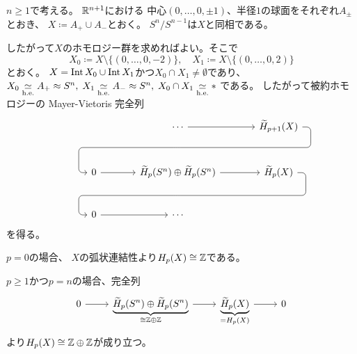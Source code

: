 \documentclass[report]{jlreq}
\begin{document}
\begin{answer}
    $n \ge 1$で考える。
    $\mathbb{R}^{n + 1}$における
    中心$(0, \dots, 0, \pm 1)$、半径$1$の球面をそれぞれ$A_{\pm}$とおき、
    $X \coloneqq A_+ \cup A_-$とおく。
    $S^n / S^{n - 1}$は$X$と同相である。
    \begin{innerproof}
        \TODO{}
    \end{innerproof}
    したがって$X$のホモロジー群を求めればよい。そこで
    \begin{equation}
        X_0 \coloneqq X \setminus \{ (0, \dots, 0, -2) \},
        \quad
        X_1 \coloneqq X \setminus \{ (0, \dots, 0, 2) \}
    \end{equation}
    とおく。
    $X = \operatorname{Int} X_0 \cup \operatorname{Int} X_1$かつ$X_0 \cap X_1 \neq \emptyset$であり、
    $X_0 \simeqhe A_+ \approx S^n, \;
        X_1 \simeqhe A_- \approx S^n, \;
        X_0 \cap X_1 \simeqhe *$
    である。
    したがって被約ホモロジーの Mayer-Vietoris 完全列
    \begin{equation}
        \begin{tikzcd}[column sep=large, row sep=large]
            && \cdots
                \ar{r} \ar[phantom]{d}[name=X1, anchor=center]{}
                & \widetilde{H}_{p+1}(X)
                    \ar[rounded corners,
                        to path={
                            -- ([xshift=2ex]\tikztostart.east)
                            |- (X1.center) \tikztonodes
                            -| ([xshift=-2ex]\tikztotarget.west)
                            -- (\tikztotarget)
                        }]{dll} \\
            & 0
                \ar{r}
                & \widetilde{H}_p(S^n) \oplus \widetilde{H}_p(S^n)
                    \ar{r}
                    \ar[phantom]{d}[name=X2, anchor=center]{}
                & \widetilde{H}_p(X)
                    \ar[rounded corners,
                        to path={
                            -- ([xshift=2ex]\tikztostart.east)
                            |- (X2.center) \tikztonodes
                            -| ([xshift=-2ex]\tikztotarget.west)
                            -- (\tikztotarget)
                        }]{dll} \\
            & 0
                \ar{r}
                & \cdots
        \end{tikzcd}
    \end{equation}
    を得る。

    $p = 0$の場合、
    $X$の弧状連結性より$H_p(X) \cong \mathbb{Z}$である。

    $p \ge 1$かつ$p = n$の場合、完全列
    \begin{equation}
        \begin{tikzcd}
            0
                \ar{r}
                & \underbrace{
                    \widetilde{H}_p(S^n) \oplus \widetilde{H}_p(S^n)
                }_{\substack{
                    \cong \Z \oplus \Z
                }}
                    \ar{r}
                & \underbrace{
                    \widetilde{H}_p(X)
                }_{= H_p(X)}
                    \ar{r}
                & 0
        \end{tikzcd}
    \end{equation}
    より$H_p(X) \cong \mathbb{Z} \oplus \mathbb{Z}$が成り立つ。


\end{answer}
\end{document}

